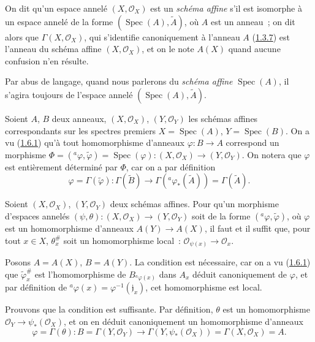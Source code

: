 \begin{definition}[1.7.1]
\label{I.1.7.1-fr}
On dit qu'un espace annelé $(X,\mathscr{O}_X)$ est un \emph{schéma affine}
s'il est isomorphe à un espace annelé de la forme
$(\operatorname{Spec}(A),\widetilde A)$, où $A$ est un anneau~; on dit alors
que $\Gamma(X,\mathscr{O}_X)$, qui s'identifie canoniquement à l'anneau $A$
(\hyperref[I.1.3.7-fr]{1.3.7}) est l'anneau du schéma affine
$(X,\mathscr{O}_X)$, et on le note $A(X)$ quand aucune confusion n'en résulte.
\end{definition}

Par abus de langage, quand nous parlerons du \emph{schéma affine}
$\operatorname{Spec}(A)$, il s'agira toujours de l'espace annelé
$(\operatorname{Spec}(A),\widetilde A)$.

\begin{env}[1.7.2]
\label{I.1.7.2-fr}
Soient $A$, $B$ deux anneaux, $(X,\mathscr{O}_X)$,
$(Y,\mathscr{O}_Y)$ les schémas affines correspondants sur les spectres
premiers $X=\operatorname{Spec}(A)$, $Y=\operatorname{Spec}(B)$. On a vu
(\hyperref[I.1.6.1-fr]{1.6.1}) qu'à tout homomorphisme d'anneaux
$\varphi:B\to A$ correspond un morphisme
$\Phi=({}^a\varphi,\widetilde\varphi)=\operatorname{Spec}(\varphi):
(X,\mathscr{O}_X)\to(Y,\mathscr{O}_Y)$. On notera que $\varphi$ est
entièrement déterminé par $\Phi$, car on a par définition
\[
  \varphi=\Gamma(\widetilde\varphi):
  \Gamma(\widetilde B)\longrightarrow
  \Gamma({}^a\varphi_*(\widetilde A))=\Gamma(\widetilde A).
\]
\end{env}

\begin{theorem}[1.7.3]
\label{I.1.7.3-fr}
Soient $(X,\mathscr{O}_X)$, $(Y,\mathscr{O}_Y)$ deux schémas affines. Pour
qu'un morphisme d'espaces annelés
$(\psi,\theta):(X,\mathscr{O}_X)\to(Y,\mathscr{O}_Y)$ soit de la forme
$({}^a\varphi,\widetilde\varphi)$, où $\varphi$ est un homomorphisme
d'anneaux $A(Y)\to A(X)$, il faut et il suffit que, pour tout $x\in X$,
$\theta_x^{\#}$ soit un homomorphisme local~:
$\mathscr{O}_{\psi(x)}\to\mathscr{O}_x$.
\end{theorem}

Posons $A=A(X)$, $B=A(Y)$. La condition est nécessaire, car on a vu
(\hyperref[I.1.6.1-fr]{1.6.1}) que $\widetilde\varphi_x^{\#}$ est
l'homomorphisme de $B_{{}^a\varphi(x)}$ dans $A_x$ déduit canoniquement de
$\varphi$, et par définition de
${}^a\varphi(x)=\varphi^{-1}(\mathfrak{j}_x)$, cet homomorphisme est local.

Prouvons que la condition est suffisante. Par définition, $\theta$ est un
homomorphisme $\mathscr{O}_Y\to\psi_*(\mathscr{O}_X)$, et on en déduit
canoniquement un homomorphisme d'anneaux
\[
  \varphi=\Gamma(\theta):
  B=\Gamma(Y,\mathscr{O}_Y)
  \longrightarrow
  \Gamma(Y,\psi_*(\mathscr{O}_X))=\Gamma(X,\mathscr{O}_X)=A.
\]

